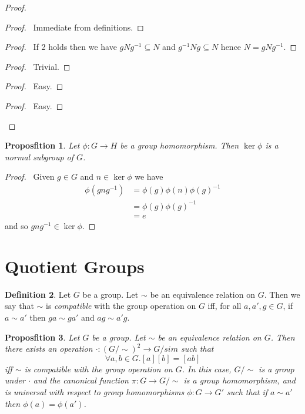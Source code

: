 \documentclass{book}
\let\qed\relax
\newtheorem{prop}{Proposfition}[chapter]
\theoremstyle{definition}
\newtheorem{df}[prop]{Definition}
\newcommand{\inv}[1]{\ensuremath{{#1}^{-1}}}
\begin{document}
\begin{proof}
\pf
{}
\begin{proof}
\pf\ Immediate from definitions.
\end{proof}
\begin{proof}
	\pf\ If 2 holds then we have $gN\inv{g} \subseteq N$ and $\inv{g}Ng \subseteq N$ hence $N = gN\inv{g}$.
\end{proof}
\begin{proof}
\pf\ Trivial.
\end{proof}
\begin{proof}
\pf\ Easy.
\end{proof}
\begin{proof}
\pf\ Easy.
\end{proof}
\qed
\end{proof}

\begin{prop}
\label{prop:kernel-normal}
Let $\phi : G \rightarrow H$ be a group homomorphism. Then $\ker \phi$ is a normal subgroup of $G$.
\end{prop}

\begin{proof}
\pf\ Given $g \in G$ and $n \in \ker \phi$ we have
\begin{align*}
\phi(gn\inv{g}) & = \phi(g) \phi(n) \inv{\phi(g)} \\
& = \phi(g) \inv{\phi(g)} \\
& = e
\end{align*}
and so $gn\inv{g} \in \ker \phi$. \qed
\end{proof}

\section{Quotient Groups}

\begin{df}
Let $G$ be a group. Let $\sim$ be an equivalence relation on $G$. Then we say that $\sim$ is \emph{compatible} with the group operation on $G$ iff, for all $a, a', g \in G$, if $a \sim a'$ then $ga \sim ga'$ and $ag \sim a'g$.
\end{df}

\begin{prop}
Let $G$ be a group. Let $\sim$ be an equivalence relation on $G$. Then there exists an operation $\cdot : (G/\sim)^2 \rightarrow G/sim$ such that
\[ \forall a,b \in G. [a][b] = [ab] \]
iff $\sim$ is compatible with the group operation on $G$. In this case, $G/\sim$ is a group under $\cdot$ and the canonical function $\pi : G \rightarrow G / \sim$ is a group homomorphism, and is universal with respect to group homomorphisms $\phi : G \rightarrow G'$ such that if $a \sim a'$ then $\phi(a) = \phi(a')$.
\end{prop}
\end{document}
